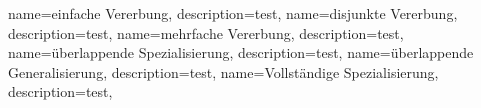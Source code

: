 {
    name={einfache Vererbung},
    description={test}, 
}
{
    name={disjunkte Vererbung},
    description={test}, 
}
{
    name={mehrfache Vererbung},
    description={test}, 
}
{
    name={überlappende Spezialisierung},
    description={test}, 
}
{
    name={überlappende Generalisierung},
    description={test}, 
}
{
    name={Vollständige Spezialisierung},
    description={test}, 
}